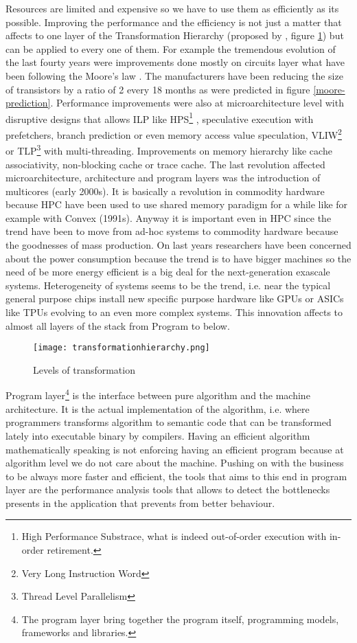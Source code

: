 Resources are limited and expensive so we have to use them as efficiently
as its possible. Improving the performance and the efficiency is not just a 
matter that affects to one
layer of the Transformation Hierarchy (proposed by
\cite{transformationHierarchy}, figure \ref{fig:transformation_hierarchy}) 
but can be applied to every one of them. For example the
tremendous evolution of the last fourty years were improvements done mostly on
circuits layer what have been following the Moore's law \cite{moore:1965}. The
manufacturers have been reducing the size of transistors by a ratio of 2 every
18 months as were predicted in figure \ref{moore-prediction}. Performance improvements 
were also at microarchitecture level with
disruptive designs that allows ILP like HPS\footnote{High Performance Substrace,
what is indeed out-of-order execution with in-order retirement.}
\cite{Patt:1985:HNM:18927.18916}, speculative execution with prefetchers, 
branch prediction or even memory access value speculation,
VLIW\footnote{Very Long Instruction Word} or TLP\footnote{Thread Level
Parallelism} with multi-threading. Improvements on memory hierarchy like cache 
associativity, non-blocking cache or trace cache. The last revolution affected 
 microarchitecture, architecture and program layers was the introduction
of multicores (early 2000s). It is basically a revolution in commodity hardware 
because HPC
have been used to use shared memory paradigm for a while like for example with
Convex (1991s). Anyway it is important even in HPC since the trend have
been to move from ad-hoc systems to commodity hardware because the goodnesses of
mass production. On last years researchers have been concerned about the
power consumption because the trend is to have bigger machines so the need of be more
energy efficient is a big deal for the next-generation exascale systems.
Heterogeneity of systems seems to be the trend, i.e. near the typical general
purpose chips install new specific purpose hardware like GPUs or ASICs like
TPUs \cite{jouppi2017datacenter} evolving to an even more complex systems. This
innovation affects to almost all layers of the stack from Program to below. 

\begin{figure}
  \caption{Levels of transformation}
  \label{fig:transformation_hierarchy}
  \centering
    \texttt{[image: transformationhierarchy.png]}
\end{figure}

Program layer\footnote{The program layer bring together the program itself, 
programming models, frameworks and libraries.} is the interface between pure 
algorithm and the machine architecture. 
It is the actual implementation of the algorithm, i.e. where programmers
transforms algorithm to semantic code that can be transformed lately into
executable binary by compilers. Having an efficient algorithm mathematically 
speaking is not enforcing having an efficient program because at algorithm level 
we do not care about the machine. Pushing on with the business to be always more 
faster and efficient, the tools that aims to this end in program layer are the 
performance analysis tools that allows to detect the bottlenecks presents in the 
application that prevents from better behaviour.


